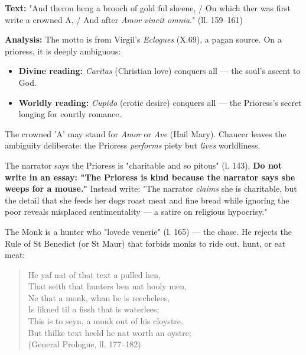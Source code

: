 \documentclass[11pt]{article}
\newcommand{\cle}[1]{{\popxbold\color{popdark}#1}}
\newcounter{popsec}
\newcounter{popsub}
\newcommand{\courssub}[1]{%
  \stepcounter{popsub}%
  \par\vspace{9pt}\noindent{\popxbold\fontsize{11.5}{13}\selectfont\color{popink}{\color{poporange}\thepopsec.\thepopsub}\hspace{6pt}#1}\par\nopagebreak\vspace{4pt}
}
\begin{document}
\begin{exemplebox}
\textbf{Text:} "And theron heng a brooch of gold ful sheene, / On which ther was first write a crowned A, / And after \textit{Amor vincit omnia}." (ll. 159–161)

\textbf{Analysis:} The motto is from Virgil's \textit{Eclogues} (X.69), a \cle{pagan} source. On a prioress, it is deeply ambiguous:
\begin{itemize}
\item \textbf{Divine reading:} \textit{Caritas} (Christian love) conquers all — the soul's ascent to God.
\item \textbf{Worldly reading:} \textit{Cupido} (erotic desire) conquers all — the Prioress's secret longing for courtly romance.
\end{itemize}
The crowned 'A' may stand for \textit{Amor} or \textit{Ave} (Hail Mary). Chaucer leaves the ambiguity deliberate: the Prioress \emph{performs} piety but \emph{lives} worldliness.
\end{exemplebox}

\begin{attention}
The narrator says the Prioress is "charitable and so pitous" (l. 143). \textbf{Do not write in an essay: "The Prioress is kind because the narrator says she weeps for a mouse."} Instead write: "The narrator \emph{claims} she is charitable, but the detail that she feeds her dogs roast meat and fine bread while ignoring the poor reveals misplaced sentimentality — a satire on religious hypocrisy."
\end{attention}

\courssub{The Monk}

The Monk is a \cle{hunter} who "lovede venerie" (l. 165) — the chase. He rejects the \cle{Rule of St Benedict} (or St Maur) that forbids monks to ride out, hunt, or eat meat:

\begin{quote}
He yaf nat of that text a pulled hen, \\
That seith that hunters ben nat hooly men, \\
Ne that a monk, whan he is recchelees, \\
Is likned til a fissh that is waterlees; \\
This is to seyn, a monk out of his cloystre. \\
But thilke text heeld he nat worth an oystre; \\
(General Prologue, ll. 177–182)
\end{quote}
\end{document}

